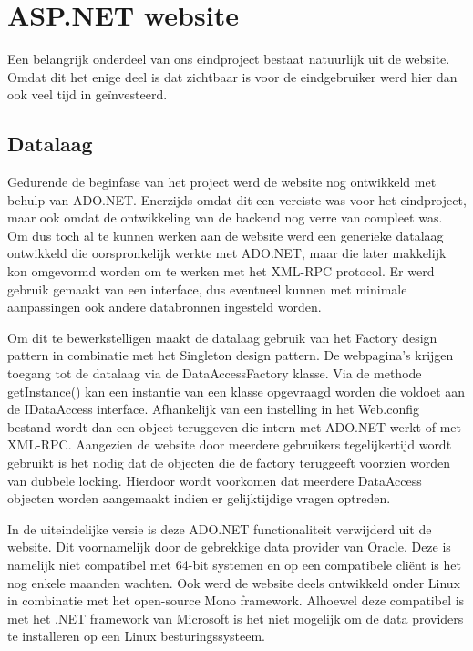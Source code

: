 %
%

\chapter{ASP.NET website}

Een belangrijk onderdeel van ons eindproject bestaat natuurlijk uit de website. Omdat dit het enige deel is dat zichtbaar is voor de eindgebruiker werd hier dan ook veel tijd in ge\"investeerd.

\section{Datalaag}

Gedurende de beginfase van het project werd de website nog ontwikkeld met behulp van ADO.NET. Enerzijds omdat dit een vereiste was voor het eindproject, maar ook omdat de ontwikkeling van de backend nog verre van compleet was. Om dus toch al te kunnen werken aan de website werd een generieke datalaag ontwikkeld die oorspronkelijk werkte met ADO.NET, maar die later makkelijk kon omgevormd worden om te werken met het XML-RPC protocol. Er werd gebruik gemaakt van een interface, dus eventueel kunnen met minimale aanpassingen ook andere databronnen ingesteld worden.

Om dit te bewerkstelligen maakt de datalaag gebruik van het Factory design pattern in combinatie met het Singleton design pattern. De webpagina's krijgen toegang tot de datalaag via de DataAccessFactory klasse. Via de methode getInstance() kan een instantie van een klasse opgevraagd worden die voldoet aan de IDataAccess interface. Afhankelijk van een instelling in het Web.config bestand wordt dan een object teruggeven die intern met ADO.NET werkt of met XML-RPC. Aangezien de website door meerdere gebruikers tegelijkertijd wordt gebruikt is het nodig dat de objecten die de factory teruggeeft voorzien worden van dubbele locking. Hierdoor wordt voorkomen dat meerdere DataAccess objecten worden aangemaakt indien er gelijktijdige vragen optreden.

In de uiteindelijke versie is deze ADO.NET functionaliteit verwijderd uit de website. Dit voornamelijk door de gebrekkige data provider van Oracle. Deze is namelijk niet compatibel met 64-bit systemen en op een compatibele cli\"ent is het nog enkele maanden wachten. Ook werd de website deels ontwikkeld onder Linux in combinatie met het open-source Mono framework. Alhoewel deze compatibel is met het .NET framework van Microsoft is het niet mogelijk om de data providers te installeren op een Linux besturingssysteem.

